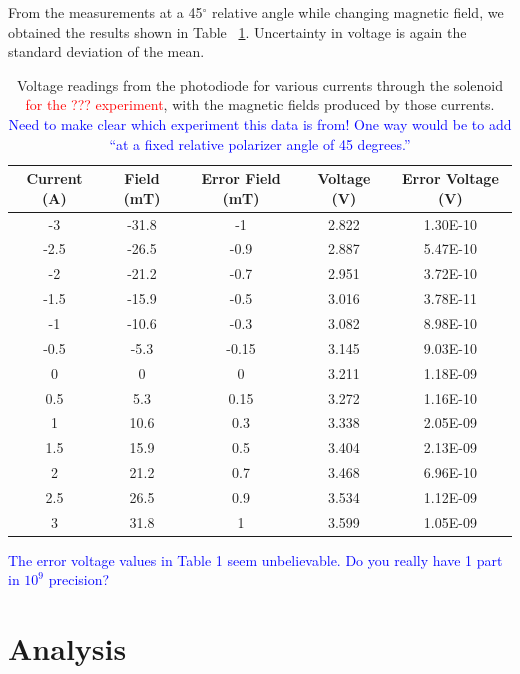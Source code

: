 \documentclass[prb,preprint]{revtex4-1}
\begin{document}
From the measurements at a 45$^{\circ}$ relative angle while changing magnetic field, we obtained the results shown in Table ~\ref{V_I_Table}. Uncertainty in voltage is again the standard deviation of the mean.

\begin{table}[h!]
\centering
\caption{Voltage readings from the photodiode for various currents through the solenoid \textcolor{red}{for the ??? experiment}, with the magnetic fields produced by those currents. \textcolor{blue}{Need to make clear which experiment this data is from! One way would be to add ``at a fixed relative polarizer angle of 45 degrees.''} }
\begin{ruledtabular}
\begin{tabular}{c c c c c}
Current (A) & Field (mT) & Error Field (mT) & Voltage (V) & Error Voltage (V)\\
\hline	%
-3   & -31.8 & -1 & 2.822 & 1.30E-10 \\
-2.5 & -26.5 & -0.9 & 2.887 & 5.47E-10 \\
-2   & -21.2 & -0.7 & 2.951 & 3.72E-10 \\
-1.5 & -15.9 & -0.5 & 3.016 & 3.78E-11 \\
-1   & -10.6 & -0.3 & 3.082 & 8.98E-10 \\
-0.5 & -5.3 & -0.15 & 3.145 & 9.03E-10 \\
0 & 0 & 0 & 3.211 & 1.18E-09 \\
0.5  & 5.3 & 0.15 & 3.272 & 1.16E-10 \\
1    & 10.6 & 0.3 & 3.338 & 2.05E-09 \\
1.5  & 15.9 & 0.5 & 3.404 & 2.13E-09 \\
2    & 21.2 & 0.7 & 3.468 & 6.96E-10 \\
2.5  & 26.5 & 0.9 & 3.534 & 1.12E-09 \\
3    & 31.8 & 1 & 3.599 & 1.05E-09
\end{tabular}
\end{ruledtabular}
\label{V_I_Table}
\end{table}

\textcolor{blue}{The error voltage values in Table 1 seem unbelievable. Do you really have 1 part in $10^9$ precision?} 

\section{Analysis}
\end{document}
